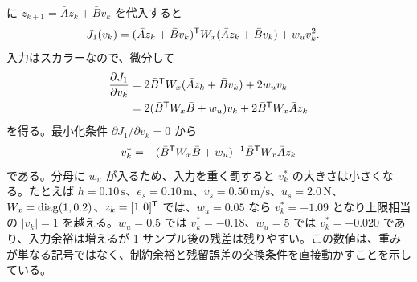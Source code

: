  に $z_{k+1}=\bar{A}z_k+\bar{B}v_k$ を代入すると
\begin{align}
  J_1(v_k)
  &=
  (\bar{A}z_k+\bar{B}v_k)^{\mathsf{T}}
  W_x
  (\bar{A}z_k+\bar{B}v_k)
  +w_u v_k^2.
\end{align}
入力はスカラーなので、微分して
\begin{align}
  \frac{\partial J_1}{\partial v_k}
  &=
  2\bar{B}^{\mathsf{T}} W_x(\bar{A}z_k+\bar{B}v_k)
  +2w_u v_k\\
  &=
  2(\bar{B}^{\mathsf{T}} W_x\bar{B}+w_u)v_k
  +2\bar{B}^{\mathsf{T}} W_x\bar{A}z_k
\end{align}
を得る。最小化条件 $\partial J_1/\partial v_k=0$ から
\begin{equation}
  v_k^*
  =
  -(\bar{B}^{\mathsf{T}} W_x\bar{B}+w_u)^{-1}
  \bar{B}^{\mathsf{T}} W_x\bar{A}z_k
  \label{eq:one-step-optimal-input}
\end{equation}
である。分母に $w_u$ が入るため、入力を重く罰すると $v_k^*$ の大きさは小さくなる。たとえば $h=0.10\,\mathrm{s}$、$e_s=0.10\,\mathrm{m}$、$v_s=0.50\,\mathrm{m/s}$、$u_s=2.0\,\mathrm{N}$、$W_x=\operatorname{diag}(1,0.2)$、$z_k=[1\ 0]^{\mathsf{T}}$ では、$w_u=0.05$ なら $v_k^*=-1.09$ となり上限相当の $|v_k|=1$ を越える。$w_u=0.5$ では $v_k^*=-0.18$、$w_u=5$ では $v_k^*=-0.020$ であり、入力余裕は増えるが 1 サンプル後の残差は残りやすい。この数値は、重みが単なる記号ではなく、制約余裕と残留誤差の交換条件を直接動かすことを示している。

